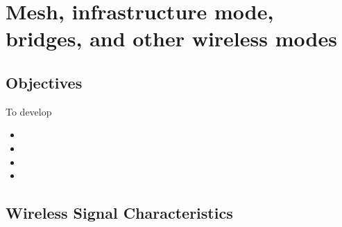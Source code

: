 \chapter{Mesh, infrastructure mode, bridges, and other wireless modes}\label{modes}

\minitoc 

\clearpage
\section*{Objectives}
To develop 
\begin{itemize}

\item 

\item 

\item 

\item 

\end{itemize}

\section{Wireless Signal Characteristics}


